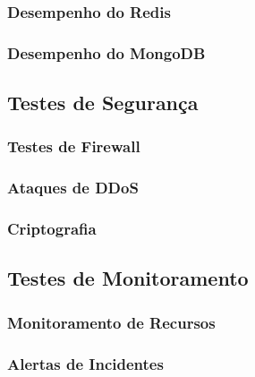 \subsubsection{Desempenho do Redis}

\subsubsection{Desempenho do MongoDB}

\subsection{Testes de Segurança}

\subsubsection{Testes de Firewall}

\subsubsection{Ataques de DDoS}

\subsubsection{Criptografia}

\subsection{Testes de Monitoramento}

\subsubsection{Monitoramento de Recursos}

\subsubsection{Alertas de Incidentes}


